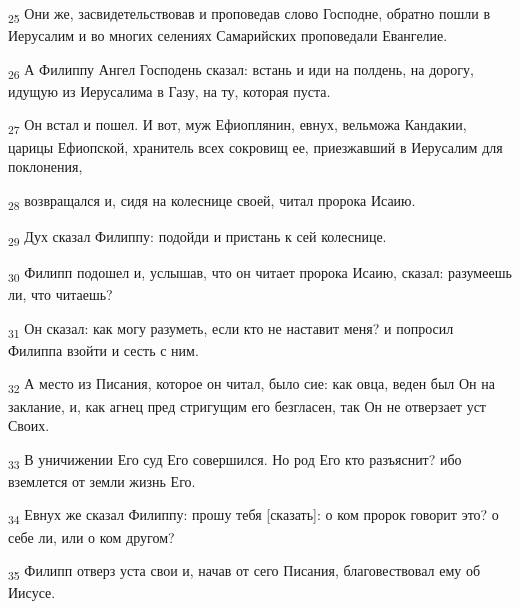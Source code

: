\begin{tcolorbox}
\textsubscript{25} Они же, засвидетельствовав и проповедав слово Господне, обратно пошли в Иерусалим и во многих селениях Самарийских проповедали Евангелие.
\end{tcolorbox}
\begin{tcolorbox}
\textsubscript{26} А Филиппу Ангел Господень сказал: встань и иди на полдень, на дорогу, идущую из Иерусалима в Газу, на ту, которая пуста.
\end{tcolorbox}
\begin{tcolorbox}
\textsubscript{27} Он встал и пошел. И вот, муж Ефиоплянин, евнух, вельможа Кандакии, царицы Ефиопской, хранитель всех сокровищ ее, приезжавший в Иерусалим для поклонения,
\end{tcolorbox}
\begin{tcolorbox}
\textsubscript{28} возвращался и, сидя на колеснице своей, читал пророка Исаию.
\end{tcolorbox}
\begin{tcolorbox}
\textsubscript{29} Дух сказал Филиппу: подойди и пристань к сей колеснице.
\end{tcolorbox}
\begin{tcolorbox}
\textsubscript{30} Филипп подошел и, услышав, что он читает пророка Исаию, сказал: разумеешь ли, что читаешь?
\end{tcolorbox}
\begin{tcolorbox}
\textsubscript{31} Он сказал: как могу разуметь, если кто не наставит меня? и попросил Филиппа взойти и сесть с ним.
\end{tcolorbox}
\begin{tcolorbox}
\textsubscript{32} А место из Писания, которое он читал, было сие: как овца, веден был Он на заклание, и, как агнец пред стригущим его безгласен, так Он не отверзает уст Своих.
\end{tcolorbox}
\begin{tcolorbox}
\textsubscript{33} В уничижении Его суд Его совершился. Но род Его кто разъяснит? ибо вземлется от земли жизнь Его.
\end{tcolorbox}
\begin{tcolorbox}
\textsubscript{34} Евнух же сказал Филиппу: прошу тебя [сказать]: о ком пророк говорит это? о себе ли, или о ком другом?
\end{tcolorbox}
\begin{tcolorbox}
\textsubscript{35} Филипп отверз уста свои и, начав от сего Писания, благовествовал ему об Иисусе.
\end{tcolorbox}
